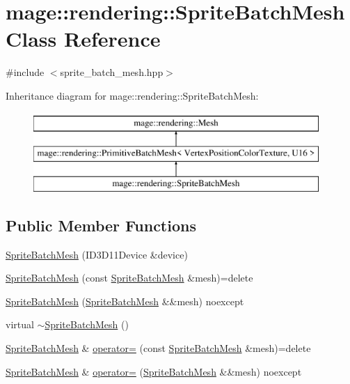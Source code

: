 \hypertarget{classmage_1_1rendering_1_1_sprite_batch_mesh}{}\section{mage\+:\+:rendering\+:\+:Sprite\+Batch\+Mesh Class Reference}
\label{classmage_1_1rendering_1_1_sprite_batch_mesh}


{\ttfamily \#include $<$sprite\+\_\+batch\+\_\+mesh.\+hpp$>$}

Inheritance diagram for mage\+:\+:rendering\+:\+:Sprite\+Batch\+Mesh\+:\begin{figure}[H]
\begin{center}
\leavevmode
\includegraphics[height=3.000000cm]{classmage_1_1rendering_1_1_sprite_batch_mesh}
\end{center}
\end{figure}
\subsection*{Public Member Functions}
\begin{DoxyCompactItemize}
\item 
\hyperlink{classmage_1_1rendering_1_1_sprite_batch_mesh_a992adb566fc9718869f0c6e6f1391df7}{Sprite\+Batch\+Mesh} (I\+D3\+D11\+Device \&device)
\item 
\hyperlink{classmage_1_1rendering_1_1_sprite_batch_mesh_a961b1df4f0e0b8dc17f968a5e61c2ce6}{Sprite\+Batch\+Mesh} (const \hyperlink{classmage_1_1rendering_1_1_sprite_batch_mesh}{Sprite\+Batch\+Mesh} \&mesh)=delete
\item 
\hyperlink{classmage_1_1rendering_1_1_sprite_batch_mesh_af36ff5857269d512b8d6799d1121599d}{Sprite\+Batch\+Mesh} (\hyperlink{classmage_1_1rendering_1_1_sprite_batch_mesh}{Sprite\+Batch\+Mesh} \&\&mesh) noexcept
\item 
virtual \hyperlink{classmage_1_1rendering_1_1_sprite_batch_mesh_a3228406dcd17c971ab84e2565c547d8c}{$\sim$\+Sprite\+Batch\+Mesh} ()
\item 
\hyperlink{classmage_1_1rendering_1_1_sprite_batch_mesh}{Sprite\+Batch\+Mesh} \& \hyperlink{classmage_1_1rendering_1_1_sprite_batch_mesh_a7855038d3367c62dcbb2d3227cdb5c81}{operator=} (const \hyperlink{classmage_1_1rendering_1_1_sprite_batch_mesh}{Sprite\+Batch\+Mesh} \&mesh)=delete
\item 
\hyperlink{classmage_1_1rendering_1_1_sprite_batch_mesh}{Sprite\+Batch\+Mesh} \& \hyperlink{classmage_1_1rendering_1_1_sprite_batch_mesh_a9ab382cdbdb112391eb857e139f6399a}{operator=} (\hyperlink{classmage_1_1rendering_1_1_sprite_batch_mesh}{Sprite\+Batch\+Mesh} \&\&mesh) noexcept
\end{DoxyCompactItemize}
